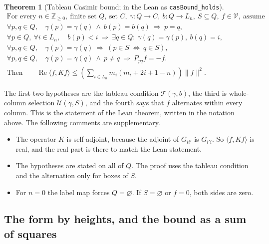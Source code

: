 \documentclass[11pt]{amsart}
\DeclareRobustCommand{\casboundname}{\texttt{casBound\_holds}}
\newtheorem{maintheorem}{Theorem}
\theoremstyle{definition}
\theoremstyle{remark}
\begin{document}
\begin{maintheorem}[Tableau Casimir bound; in the Lean as \casboundname]\label{thm:A}
\[
\begin{gathered}
\text{For every }n\in\mathbb Z_{\ge0},\ \text{finite set }Q,\ \text{set }C,\
\gamma:Q\to C,\ b:Q\to L_n,\ S\subseteq Q,\ f\in\mathcal V,\ \text{assume}\\
\forall p,q\in Q,\quad
  \gamma(p)=\gamma(q)\ \land\ b(p)=b(q)\ \Longrightarrow\ p=q,\\
\forall p\in Q,\ \forall i\in L_n,\quad
  b(p)<i\ \Longrightarrow\ \exists q\in Q:\ \gamma(q)=\gamma(p),\ b(q)=i,\\
\forall p,q\in Q,\quad
  \gamma(p)=\gamma(q)\ \Longrightarrow\ (p\in S\ \Longleftrightarrow\ q\in S),\\
\forall p,q\in Q,\quad
  \gamma(p)=\gamma(q)\ \land\ p\ne q\ \Longrightarrow\ P_{pq}f=-f.
\\[3pt]
\text{Then}\qquad
\operatorname{Re}\langle f,Kf\rangle
\le \left(\sum_{i\in L_n}m_i(m_i+2i+1-n)\right)\|f\|^2 .
\end{gathered}
\]
\end{maintheorem}

The first two hypotheses are the tableau condition \(\mathcal T(\gamma,b)\),
the third is whole-column selection \(\mathcal U(\gamma,S)\), and the fourth
says that \(f\) alternates within every column. This is the statement of the
Lean theorem, written in the notation above. The following comments are
supplementary.
\begin{itemize}
\item The operator \(K\) is self-adjoint, because the adjoint of \(G_{ii'}\)
  is \(G_{i'i}\). So \(\langle f,Kf\rangle\) is real, and the real part is
  there to match the Lean statement.
\item The hypotheses are stated on all of \(Q\). The proof uses the tableau
  condition and the alternation only for boxes of \(S\).
\item For \(n=0\) the label map forces \(Q=\varnothing\). If \(S=\varnothing\) or \(f=0\), both sides are
  zero.
\end{itemize}

\subsection{The form by heights, and the bound as a sum of squares}
\end{document}
